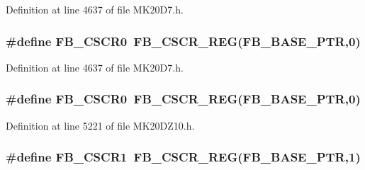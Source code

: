 Definition at line 4637 of file M\+K20\+D7.\+h.

\subsubsection[{\texorpdfstring{F\+B\+\_\+\+C\+S\+C\+R0}{FB_CSCR0}}]{\setlength{\rightskip}{0pt plus 5cm}\#define F\+B\+\_\+\+C\+S\+C\+R0~{\bf F\+B\+\_\+\+C\+S\+C\+R\+\_\+\+R\+EG}({\bf F\+B\+\_\+\+B\+A\+S\+E\+\_\+\+P\+TR},0)}\hypertarget{group___f_b___register___accessor___macros_ga4dc6cf9d294cbc4edba6420b9f38a776}{}\label{group___f_b___register___accessor___macros_ga4dc6cf9d294cbc4edba6420b9f38a776}


Definition at line 4637 of file M\+K20\+D7.\+h.

\subsubsection[{\texorpdfstring{F\+B\+\_\+\+C\+S\+C\+R0}{FB_CSCR0}}]{\setlength{\rightskip}{0pt plus 5cm}\#define F\+B\+\_\+\+C\+S\+C\+R0~{\bf F\+B\+\_\+\+C\+S\+C\+R\+\_\+\+R\+EG}({\bf F\+B\+\_\+\+B\+A\+S\+E\+\_\+\+P\+TR},0)}\hypertarget{group___f_b___register___accessor___macros_ga4dc6cf9d294cbc4edba6420b9f38a776}{}\label{group___f_b___register___accessor___macros_ga4dc6cf9d294cbc4edba6420b9f38a776}


Definition at line 5221 of file M\+K20\+D\+Z10.\+h.

\subsubsection[{\texorpdfstring{F\+B\+\_\+\+C\+S\+C\+R1}{FB_CSCR1}}]{\setlength{\rightskip}{0pt plus 5cm}\#define F\+B\+\_\+\+C\+S\+C\+R1~{\bf F\+B\+\_\+\+C\+S\+C\+R\+\_\+\+R\+EG}({\bf F\+B\+\_\+\+B\+A\+S\+E\+\_\+\+P\+TR},1)}\hypertarget{group___f_b___register___accessor___macros_ga779a99ad40919a1fcb72119db239a8d3}{}\label{group___f_b___register___accessor___macros_ga779a99ad40919a1fcb72119db239a8d3}



